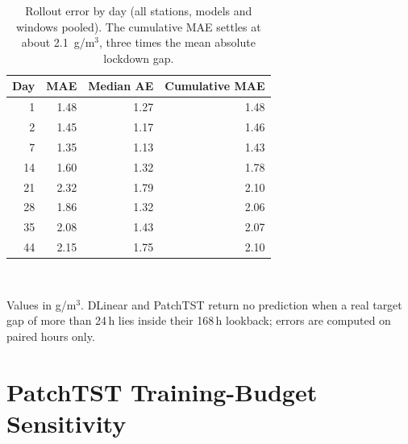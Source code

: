 \begin{table}[!htbp]
\centering\small
\caption{Rollout error by day (all stations, models and windows pooled). The cumulative MAE settles at about 2.1~\textmu g/m$^3$, three times the mean absolute lockdown gap.}
\label{tab:app-horizon}
\begin{tabular}{rrrr}
\toprule
Day & MAE & Median AE & Cumulative MAE \\
\midrule
1 & 1.48 & 1.27 & 1.48 \\
2 & 1.45 & 1.17 & 1.46 \\
7 & 1.35 & 1.13 & 1.43 \\
14 & 1.60 & 1.32 & 1.78 \\
21 & 2.32 & 1.79 & 2.10 \\
28 & 1.86 & 1.32 & 2.06 \\
35 & 2.08 & 1.43 & 2.07 \\
44 & 2.15 & 1.75 & 2.10 \\
\bottomrule
\end{tabular}
\\[2pt]\parbox{0.92\textwidth}{\footnotesize Values in \textmu g/m$^3$. DLinear and PatchTST return no prediction when a real target gap of more than 24\,h lies inside their 168\,h lookback; errors are computed on paired hours only.}
\end{table}


\FloatBarrier
\section{PatchTST Training-Budget Sensitivity}
\label{app:patchtst}



